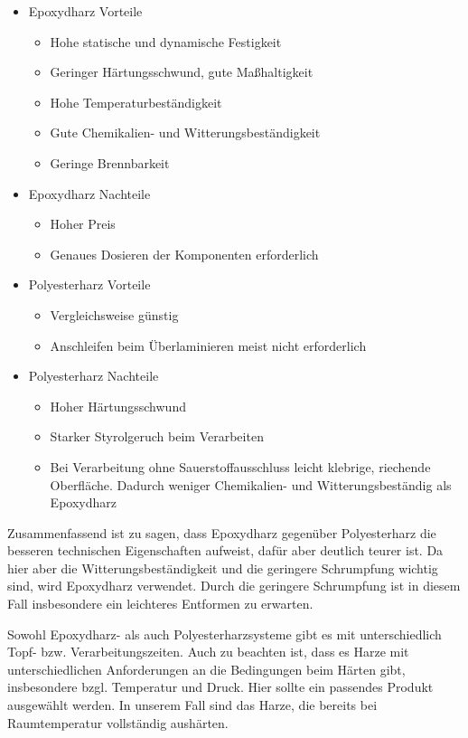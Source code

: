 \documentclass[paper=A4,pagesize,DIV=18, 12pt,listof=totoc,bibliography=totoc,headings=optiontohead,open=any]{article}
\begin{document}
\begin{itemize}
	\item Epoxydharz Vorteile
	\begin{itemize}
		\item Hohe statische und dynamische Festigkeit
		\item Geringer Härtungsschwund, gute Maßhaltigkeit
		\item Hohe Temperaturbeständigkeit
		\item Gute Chemikalien- und Witterungsbeständigkeit
		\item Geringe Brennbarkeit
	\end{itemize}
	\item Epoxydharz Nachteile
	\begin{itemize}
		\item Hoher Preis
		\item Genaues Dosieren der Komponenten erforderlich
	\end{itemize}
	\item Polyesterharz Vorteile	
	\begin{itemize}
		\item Vergleichsweise günstig
		\item Anschleifen beim Überlaminieren meist nicht erforderlich
	\end{itemize} 
	\item Polyesterharz Nachteile
	\begin{itemize}
		\item Hoher Härtungsschwund
		\item Starker Styrolgeruch beim Verarbeiten
		\item Bei Verarbeitung ohne Sauerstoffausschluss leicht klebrige, riechende Oberfläche. Dadurch weniger Chemikalien- und Witterungsbeständig als Epoxydharz
	\end{itemize}	 
\end{itemize}

Zusammenfassend ist zu sagen, dass Epoxydharz gegenüber Polyesterharz die besseren technischen Eigenschaften aufweist, dafür aber deutlich teurer ist. Da hier aber die Witterungsbeständigkeit und die geringere Schrumpfung wichtig sind, wird Epoxydharz verwendet. Durch die geringere Schrumpfung ist in diesem Fall insbesondere ein leichteres Entformen zu erwarten.

Sowohl Epoxydharz- als auch Polyesterharzsysteme gibt es mit unterschiedlich Topf- bzw. Verarbeitungszeiten. Auch zu beachten ist, dass es Harze mit unterschiedlichen Anforderungen an die Bedingungen beim Härten gibt, insbesondere bzgl. Temperatur und Druck. Hier sollte ein passendes Produkt ausgewählt werden. In unserem Fall sind das Harze, die bereits bei Raumtemperatur vollständig aushärten.
\end{document}
